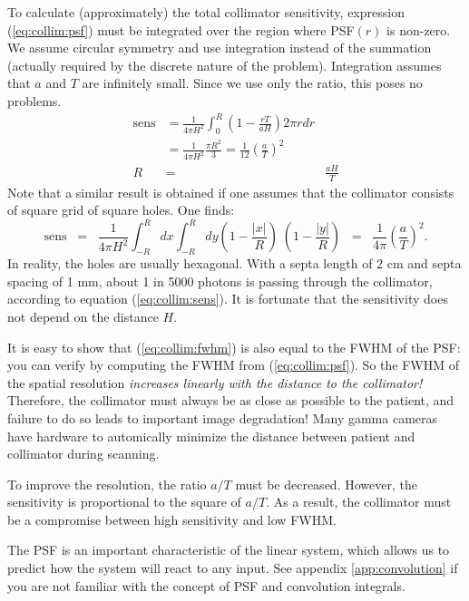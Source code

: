 \documentclass[11pt,oneside]{book}
\begin{document}
To calculate (approximately) the total collimator sensitivity, expression
(\ref{eq:collim:psf}) must be integrated over the region where PSF$(r)$ is
non-zero. We assume circular symmetry and use integration instead of the
summation (actually required by the discrete nature of the problem).
Integration assumes that $a$ and $T$ are infinitely small. Since we use only
the ratio, this poses no problems.
%
\begin{align}
\mbox{sens} &= \frac{1}{4 \pi H^2}
                  \int_0^R (1 - \frac{r T}{a H}) 2 \pi r dr \nonumber \\
            &= \frac{1}{4 \pi H^2}\frac{\pi R^2}{3}
             = \frac{1}{12} \left( \frac{a}{T} \right)^2
    \label{eq:collim:sens}\\
R & = & \frac{a H}{T} 
\label{eq:collim:fwhm}
\end{align}
%
Note that a similar result is obtained if one assumes that the
collimator consists of square grid of square holes. One finds:
\begin{equation}
\mbox{sens} \;\; = \;\;  \frac{1}{4 \pi H^2} 
  \int_{-R}^{R} dx \int_{-R}^{R} dy (1 - \frac{|x|}{R}) \; (1 -
  \frac{|y|}{R})
  \;\; = \;\; \frac{1}{4 \pi} \left( \frac{a}{T} \right)^2.
\end{equation}
In reality, the holes are usually hexagonal. With a septa length of 2
cm and septa spacing of 1 mm, about 1 in 5000 photons is passing
through the collimator, according to equation
(\ref{eq:collim:sens}). It is fortunate that the sensitivity does not
depend on the distance $H$.


It is easy to show that (\ref{eq:collim:fwhm}) is also equal to the FWHM of the
PSF: you can verify by computing the FWHM from (\ref{eq:collim:psf}). So the
FWHM of the spatial resolution {\em increases linearly with the distance to
the collimator!}  Therefore, the collimator must always be as close as
possible to the patient, and failure to do so leads to important image
degradation! Many gamma cameras have hardware to automically minimize
the distance between patient and collimator during scanning.

To improve the resolution, the ratio $a/T$ must be decreased. However, the
sensitivity is proportional to the square of $a/T$. As a result, the
collimator must be a compromise between high sensitivity and low FWHM.

The PSF is an important characteristic of the linear system, which allows us
to predict how the system will react to any input. See appendix
\ref{app:convolution} if you are not familiar with the concept of PSF and
convolution integrals.
\end{document}
